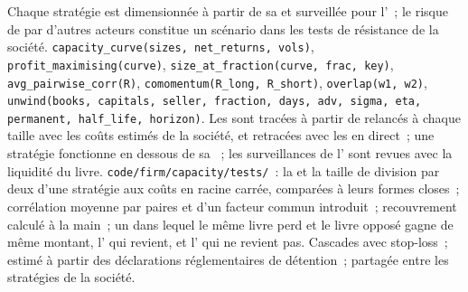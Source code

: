 \begin{build}
 Chaque stratégie est dimensionnée à partir de sa  et surveillée pour l'~; le risque de  par d'autres acteurs constitue un scénario dans les
tests de résistance de la société.
 \texttt{capacity\_curve(sizes, net\_returns, vols)}, \texttt{profit\_maximising(curve)}, \texttt{size\_at\_fraction(curve, frac, key)},
\texttt{avg\_pairwise\_corr(R)}, \texttt{comomentum(R\_long, R\_short)}, \texttt{overlap(w1, w2)},
\texttt{unwind(books, capitals, seller, fraction, days, adv, sigma, eta, permanent, half\_life, horizon)}.
 Les  sont tracées à partir de  relancés à chaque taille avec les coûts estimés de la société, et retracées avec les  en direct~; une
stratégie fonctionne en dessous de sa ~; les surveillances de l' sont revues avec la liquidité du livre.
 \texttt{code/firm/capacity/tests/}~: la  et la taille de division par deux d'une stratégie aux coûts en racine carrée, comparées à leurs
formes closes~; corrélation moyenne par paires et  d'un facteur commun introduit~; recouvrement calculé à la main~; un  dans lequel le même livre perd et le livre opposé gagne
de même montant, l' qui revient, et l' qui ne revient pas.
 Cascades avec stop-loss~;  estimé à partir des déclarations réglementaires de détention~;  partagée entre les stratégies de la société.
\end{build}

